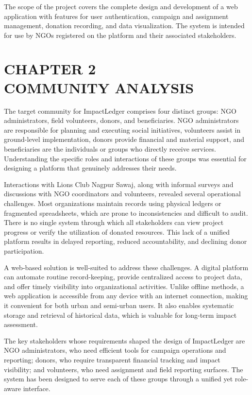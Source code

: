 \documentclass[12pt,a4paper]{article}
\begin{document}
The scope of the project covers the complete design and development of a web application with features for user authentication, campaign and assignment management, donation recording, and data visualization. The system is intended for use by NGOs registered on the platform and their associated stakeholders.

\newpage
\section{CHAPTER 2\\COMMUNITY ANALYSIS}
The target community for ImpactLedger comprises four distinct groups: NGO administrators, field volunteers, donors, and beneficiaries. NGO administrators are responsible for planning and executing social initiatives, volunteers assist in ground-level implementation, donors provide financial and material support, and beneficiaries are the individuals or groups who directly receive services. Understanding the specific roles and interactions of these groups was essential for designing a platform that genuinely addresses their needs.

Interactions with Lions Club Nagpur Sawaj, along with informal surveys and discussions with NGO coordinators and volunteers, revealed several operational challenges. Most organizations maintain records using physical ledgers or fragmented spreadsheets, which are prone to inconsistencies and difficult to audit. There is no single system through which all stakeholders can view project progress or verify the utilization of donated resources. This lack of a unified platform results in delayed reporting, reduced accountability, and declining donor participation.

A web-based solution is well-suited to address these challenges. A digital platform can automate routine record-keeping, provide centralized access to project data, and offer timely visibility into organizational activities. Unlike offline methods, a web application is accessible from any device with an internet connection, making it convenient for both urban and semi-urban users. It also enables systematic storage and retrieval of historical data, which is valuable for long-term impact assessment.

The key stakeholders whose requirements shaped the design of ImpactLedger are NGO administrators, who need efficient tools for campaign operations and reporting; donors, who require transparent financial tracking and impact visibility; and volunteers, who need assignment and field reporting surfaces. The system has been designed to serve each of these groups through a unified yet role-aware interface.
\end{document}
